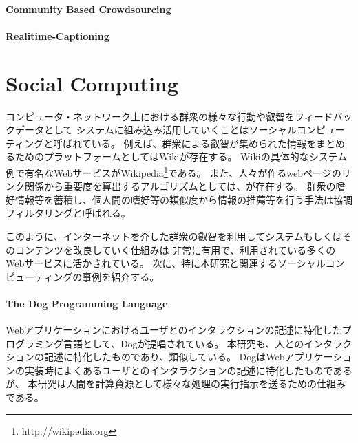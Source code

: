 \paragraph{Community Based
Crowdsourcing}\label{community-based-crowdsourcing}

\mbox{}

\cite{community-based-crowdsourcing}

\paragraph{Realitime-Captioning}\label{realitime-captioning}

\mbox{}

\cite{realtime-captioning}

\section{Social Computing}\label{social-computing}

コンピュータ・ネットワーク上における群衆の様々な行動や叡智をフィードバックデータとして
システムに組み込み活用していくことはソーシャルコンピューティングと呼ばれている。
例えば、群衆による叡智が集められた情報をまとめるためのプラットフォームとしてはWiki\cite{wiki-way}が存在する。
Wikiの具体的なシステム例で有名なWebサービスがWikipedia\footnote{http://wikipedia.org}である。
また、人々が作るwebページのリンク関係から重要度を算出するアルゴリズムとしては、\cite{pagerank}が存在する。
群衆の嗜好情報等を蓄積し、個人間の嗜好等の類似度から情報の推薦等を行う手法は協調フィルタリングと呼ばれる\cite{collaborative-filtering}。

このように、インターネットを介した群衆の叡智を利用してシステムもしくはそのコンテンツを改良していく仕組みは
非常に有用で、利用されている多くのWebサービスに活かされている。
次に、特に本研究と関連するソーシャルコンピューティングの事例を紹介する。

\paragraph{The Dog Programming
Language}\label{the-dog-programming-language}

\mbox{}

Webアプリケーションにおけるユーザとのインタラクションの記述に特化したプログラミング言語として、Dog\cite{dog}が提唱されている。
本研究も、人とのインタラクションの記述に特化したものであり、類似している。
DogはWebアプリケーションの実装時によくあるユーザとのインタラクションの記述に特化したものであるが、
本研究は人間を計算資源として様々な処理の実行指示を送るための仕組みである。


